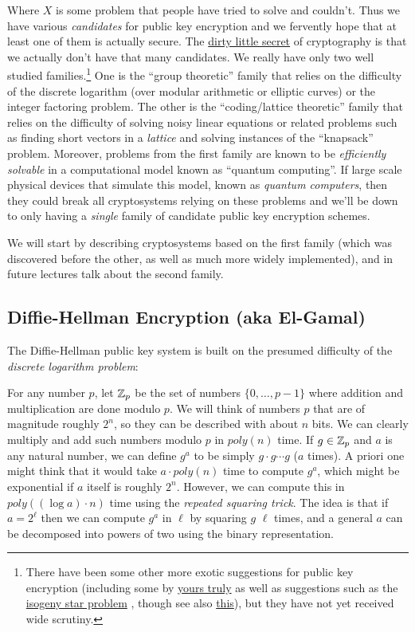 Where \(X\) is some problem that people have tried to solve and
couldn't. Thus we have various \emph{candidates} for public key
encryption and we fervently hope that at least one of them is actually
secure. The \href{https://eprint.iacr.org/2017/365.pdf}{dirty little
secret} of cryptography is that we actually don't have that many
candidates. We really have only two well studied families.\footnote{There
  have been some other more exotic suggestions for public key encryption
  (including some by
  \href{http://www.eng.tau.ac.il/~bennyap/pubs/ncpkcFull1.pdf}{yours
  truly} as well as suggestions such as the
  \href{http://eprint.iacr.org/2006/291}{isogeny star problem} , though
  see also \href{http://arxiv.org/pdf/1012.4019.pdf}{this}), but they
  have not yet received wide scrutiny.} One is the ``group theoretic''
family that relies on the difficulty of the discrete logarithm (over
modular arithmetic or elliptic curves) or the integer factoring problem.
The other is the ``coding/lattice theoretic'' family that relies on the
difficulty of solving noisy linear equations or related problems such as
finding short vectors in a \emph{lattice} and solving instances of the
``knapsack'' problem. Moreover, problems from the first family are known
to be \emph{efficiently solvable} in a computational model known as
``quantum computing''. If large scale physical devices that simulate
this model, known as \emph{quantum computers}, then they could break all
cryptosystems relying on these problems and we'll be down to only having
a \emph{single} family of candidate public key encryption schemes.

We will start by describing cryptosystems based on the first family
(which was discovered before the other, as well as much more widely
implemented), and in future lectures talk about the second family.

\subsection{Diffie-Hellman Encryption (aka
El-Gamal)}\label{Diffie-Hellman-Encryption}

The Diffie-Hellman public key system is built on the presumed difficulty
of the \emph{discrete logarithm problem}:

For any number \(p\), let \({\mathbb{Z}}_p\) be the set of numbers
\(\{0,\ldots,p-1\}\) where addition and multiplication are done modulo
\(p\). We will think of numbers \(p\) that are of magnitude roughly
\(2^n\), so they can be described with about \(n\) bits. We can clearly
multiply and add such numbers modulo \(p\) in \(poly(n)\) time. If
\(g\in {\mathbb{Z}}_p\) and \(a\) is any natural number, we can define \(g^a\) to
be simply \(g\cdot g \cdots g\) (\(a\) times). A priori one might think
that it would take \(a\cdot poly(n)\) time to compute \(g^a\), which
might be exponential if \(a\) itself is roughly \(2^n\). However, we can
compute this in \(poly((\log a) \cdot n)\) time using the \emph{repeated
squaring trick}. The idea is that if \(a=2^{\ell}\) then we can compute
\(g^a\) in \(\ell\) by squaring \(g\) \(\ell\) times, and a general
\(a\) can be decomposed into powers of two using the binary
representation.

